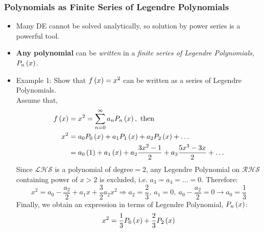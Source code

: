 \subsubsection{Polynomials as Finite Series of Legendre Polynomials}
\begin{itemize}[\tiny$\bullet$]
    \item Many DE cannot be solved analytically, so solution by power series is a powerful tool.
    \item \textbf{Any polynomial} can be \textit{written} in a \textit{finite series of Legendre Polynomials, $P_n\left(x\right)$}.
    \item Example 1: Show that $f\left(x\right)=x^2$ can be written as a series of Legendre Polynomials.\\
    Assume that,
    \begin{align*}
        f\left(x\right)&=x^2=\sum_{n=0}^{\infty}a_nP_n\left(x\right),\text{ then}\\
        x^2&=a_0P_0\left(x\right)+a_1P_1\left(x\right)+a_2P_2\left(x\right)+\ldots\\
        &=a_0\left(1\right)+a_1\left(x\right)+a_2\frac{3x^2-1}{2}+a_3\frac{5x^3-3x}{2}+\ldots
    \end{align*}
    Since $\mathcal{LHS}$ is a polynomial of $\text{degree}=2$, any Legendre Polynomial on $\mathcal{RHS}$ containing power of $x>2$ is excluded, i.e. $a_3=a_4=\ldots=0$. Therefore:
    \begin{equation*}
        x^2=a_0-\frac{a_2}{2}+a_1x+\frac{3}{2}a_2x^2\Longrightarrow a_2=\frac{2}{3},\ a_1=0,\ a_0-\frac{a_2}{2}=0\rightarrow a_0=\frac{1}{3}
    \end{equation*}
    Finally, we obtain an expression in terms of Legendre Polynomial, $P_n\left(x\right)$:
    \begin{equation*}
        x^2=\frac{1}{3}P_0\left(x\right)+\frac{2}{3}P_2\left(x\right)
    \end{equation*}
\end{itemize}
